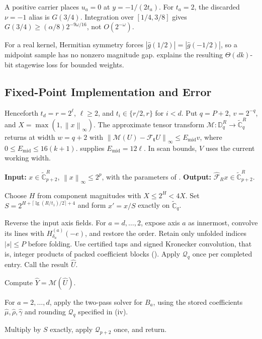 \documentclass[11pt]{article}
\theoremstyle{definition}
\renewcommand{\label}[1]{}%
\newcommand{\Cg}{\widetilde{\mathbb{C}}}
\newcommand{\Disk}{\mathbb{D}}
\newcommand{\cF}{\mathcal{F}}
\newcommand{\Quant}{\mathcal{Q}}
\newcommand{\norm}[1]{\left\lVert #1 \right\rVert}
\newcommand{\abs}[1]{\left\lvert #1 \right\rvert}
\newcommand{\Bridge}{\textnormal{\textsc{Bridge}}}
\begin{document}
A positive carrier places $u_a=0$ at $y=-1/(2t_a)$.
For $t_a=2$, the discarded $\nu=-1$ alias is $G(3/4)$.
Integration over $[1/4,3/8]$ gives
$G(3/4)\ge(\alpha/8)2^{-9\omega/16}$, not $O(2^{-\omega})$.

For a real kernel, Hermitian symmetry forces
$\abs{\widehat g(1/2)}=\abs{\widehat g(-1/2)}$, so a midpoint sample has
no nonzero magnitude gap.
 explains the resulting $\Theta(dk)$-bit stagewise loss
for bounded weights.

\subsection{Fixed-Point Implementation and Error}\label{sec:bridge-fp}

Henceforth $t_d=r=2^\ell$, $\ell\ge2$, and $t_i\in\{r/2,r\}$ for $i<d$.
Put $q=P+2$, $v=2^{-q}$, and $X=\max(1,\norm{x}_\infty)$.
The approximate tensor transform $\mathcal M:\Disk_q^R\to\Cg_q^R$
returns at width $w=q+2$ with
$\norm{\mathcal M(U)-\cF_{\mathbf t}U}_\infty\le E_{\mathrm{mid}}v$,
where $0\le E_{\mathrm{mid}}\le16(k+1)$.
 supplies $E_{\mathrm{mid}}=12\ell$.
In scan bounds, $V$ uses the current working width.

\begin{algorithm}[tb]
\caption{Fixed-point $\Bridge(x)$}\label{alg:bridge}
\small
\textbf{Input:} $x\in\Cg_{p+2}^R$, $\norm{x}_\infty\le2^p$,
with the parameters of .
\textbf{Output:} $\widehat{\cF}_Rx\in\Cg_{p+2}^R$.
\begin{algsteps}[itemsep=1pt,topsep=2pt]
\item Choose $H$ from component magnitudes with $X\le2^H<4X$.
Set $S=2^{H+\lceil\lg(R/t_1)/2\rceil+4}$ and form $x'=x/S$ exactly on $\Cg_q$.
\item Reverse the input axis fields. For $a=d,\ldots,2$, expose axis $a$
as innermost, convolve its lines with $H_{\delta_a}^{(a)}(-e)$, and restore
the order. Retain only unfolded indices $\abs{s}\le P$ before folding.
Use certified taps and signed Kronecker convolution, that is, integer
products of packed coefficient blocks ().
Apply $\Quant_q$ once per completed entry. Call the result $\widehat U$.
\item Compute $\widehat Y=\mathcal M(\widehat U)$.
\item For $a=2,\ldots,d$, apply the two-pass solver for $B_a$, using
the stored coefficients $\hat\mu,\hat\rho,\hat\gamma$ and rounding
$\Quant_q$ specified in \textup{(iv)}.
\item Multiply by $S$ exactly, apply $\Quant_{p+2}$ once, and return.
\end{algsteps}
\end{algorithm}
\end{document}
